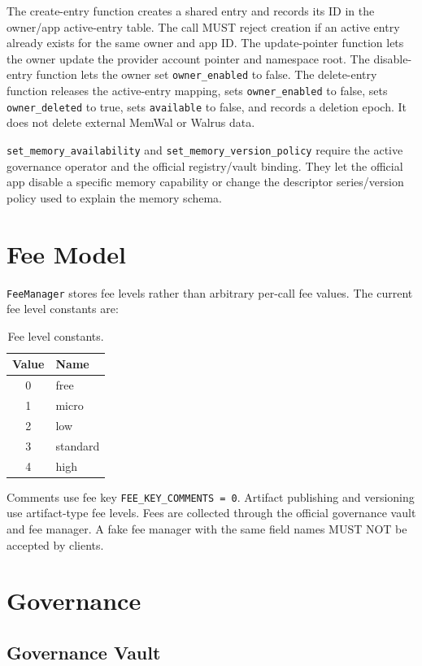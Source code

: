 \documentclass[11pt]{article}
\newcommand{\code}[1]{\texttt{#1}}
\begin{document}
The create-entry function creates a shared entry and records its ID in the
owner/app active-entry table. The call MUST reject creation if an active entry
already exists for the same owner and app ID. The update-pointer function lets
the owner update the provider account pointer and namespace root. The
disable-entry function lets the owner set \code{owner\_enabled} to false. The
delete-entry function releases the active-entry mapping, sets
\code{owner\_enabled} to false, sets \code{owner\_deleted} to true, sets
\code{available} to false, and records a deletion epoch. It does not delete
external MemWal or Walrus data.

\code{set\_memory\_availability} and \code{set\_memory\_version\_policy} require
the active governance operator and the official registry/vault binding. They
let the official app disable a specific memory capability or change the
descriptor series/version policy used to explain the memory schema.

\section{Fee Model}

\code{FeeManager} stores fee levels rather than arbitrary per-call fee values. The current fee level constants are:

\begin{table}[htbp]
\centering
\caption{Fee level constants.}
\begin{tabular}{cl}
\toprule
\textbf{Value} & \textbf{Name} \\
\midrule
0 & free \\
1 & micro \\
2 & low \\
3 & standard \\
4 & high \\
\bottomrule
\end{tabular}
\end{table}

Comments use fee key \code{FEE\_KEY\_COMMENTS = 0}. Artifact publishing and versioning use artifact-type fee levels. Fees are collected through the official governance vault and fee manager. A fake fee manager with the same field names MUST NOT be accepted by clients.

\section{Governance}

\subsection{Governance Vault}
\end{document}

